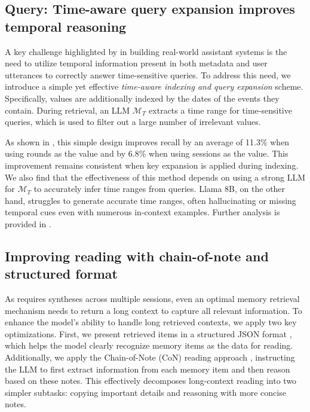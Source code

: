  

 
\subsection{Query: Time-aware query expansion improves temporal reasoning}
\label{section-query-results}


A key challenge highlighted by \BENCHMARK{} in building real-world assistant systems is the need to utilize temporal information present in both metadata and user utterances to correctly answer time-sensitive queries. To address this need, we introduce a simple yet effective \textit{time-aware indexing and query expansion} scheme. Specifically, values are additionally indexed by the dates of the events they contain. During retrieval, an LLM $\mathcal{M}_{T}$ extracts a time range for time-sensitive queries, which is used to filter out a large number of irrelevant values.

As shown in , {this simple design improves recall by an average of 11.3\% when using rounds as the value and by 6.8\% when using sessions as the value.} This improvement remains consistent when key expansion is applied during indexing. We also find that the effectiveness of this method depends on using a strong LLM for $\mathcal{M}_{T}$ to accurately infer time ranges from queries. Llama 8B, on the other hand, struggles to generate accurate time ranges, often hallucinating or missing temporal cues even with numerous in-context examples. Further analysis is provided in .



 
 
\subsection{Improving reading with chain-of-note and structured format}
\label{section-reading-results}

{As \BENCHMARK{} requires syntheses across multiple sessions, even an optimal memory retrieval mechanism needs to return a long context to capture all relevant information. To enhance the model's ability to handle long retrieved contexts, we apply two key optimizations.} First, we present retrieved items in a structured JSON format \citep{yin-etal-2023-read}, which helps the model clearly recognize memory items as the data for reading. Additionally, we apply the Chain-of-Note (CoN) reading approach \citep{yu2023chain}, instructing the LLM to first extract information from each memory item and then reason based on these notes. This effectively decomposes long-context reading into two simpler subtasks: copying important details and reasoning with more concise notes.

